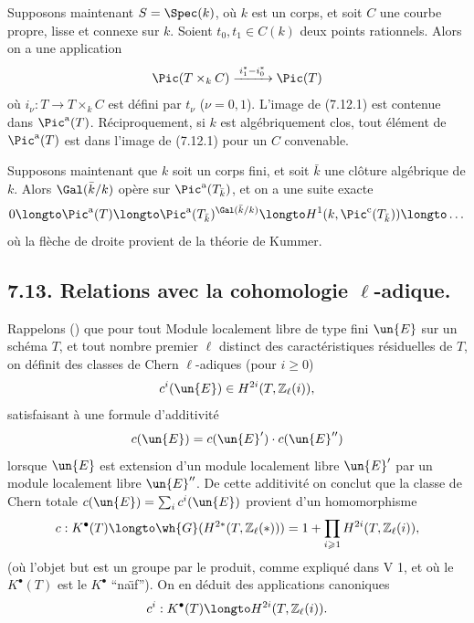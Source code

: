 Supposons maintenant $S = \Spec(k)$, o\`u $k$ est un corps, et soit $C$ une courbe propre, lisse et connexe sur $k$. Soient $t_{0}, t_{1} \in C(k)$ deux points rationnels. Alors on a une application
\begin{equation}\label{eq:7.12.1}
\Pic(T \times_{k} C) \xrightarrow{\;i_{1}^{*} - i_{0}^{*}\;} \Pic(T)
\end{equation}
o\`u $i_{\nu} : T \to T \times_{k} C$ est d\'efini par $t_{\nu}$ ($\nu = 0, 1$). L'image de (7.12.1) est contenue dans $\Pic^{\mathrm{a}}(T)$. R\'eciproquement, si $k$ est alg\'ebriquement clos, tout \'el\'ement de $\Pic^{\mathrm{a}}(T)$ est dans l'image de (7.12.1) pour un $C$ convenable.

Supposons maintenant que $k$ soit un corps fini, et soit $\bar{k}$ une cl\^oture alg\'ebrique de $k$. Alors $\Gal(\bar{k}/k)$ op\`ere sur $\Pic^{\mathrm{a}}(T_{\bar{k}})$, et on a une suite exacte
\[
0 \longto \Pic^{\mathrm{a}}(T) \longto \Pic^{\mathrm{a}}(T_{\bar{k}})^{\Gal(\bar{k}/k)} \longto H^{1}(k, \Pic^{\mathrm{c}}(T_{\bar{k}})) \longto \dots
\]
o\`u la fl\`eche de droite provient de la th\'eorie de Kummer.

\subsection*{7.13. Relations avec la cohomologie $\ell$-adique.}

Rappelons () que pour tout Module localement libre de type fini $\un{E}$ sur un sch\'ema $T$, et tout nombre premier $\ell$ distinct des caract\'eristiques r\'esiduelles de $T$, on d\'efinit des classes de Chern $\ell$-adiques (pour $i \geqslant 0$)
\[
c^{i}(\un{E}) \in H^{2i}(T, \mathbb{Z}_{\ell}(i)),
\]
satisfaisant \`a une formule d'additivit\'e
\[
c(\un{E}) = c(\un{E}') \cdot c(\un{E}'')
\]
lorsque $\un{E}$ est extension d'un module localement libre $\un{E}'$ par un module localement libre $\un{E}''$. De cette additivit\'e on conclut que la classe de Chern totale $c(\un{E}) = \sum_{i} c^{i}(\un{E})$ provient d'un homomorphisme
\begin{equation}\label{eq:7.13.0}
c : K^{\bullet}(T) \longto \wh{G}(H^{2*}(T, \mathbb{Z}_{\ell}(*))) = 1 + \prod_{i \geqslant 1} H^{2i}(T, \mathbb{Z}_{\ell}(i)),
\end{equation}
(o\`u l'objet but est un groupe par le produit, comme expliqu\'e dans V 1, et o\`u le $K^{\bullet}(T)$ est le $K^{\bullet}$ ``na\"\i f''). On en d\'eduit des applications canoniques
\begin{equation}\label{eq:7.13.1}
c^{i} : K^{\bullet}(T) \longto H^{2i}(T, \mathbb{Z}_{\ell}(i)).
\end{equation}

